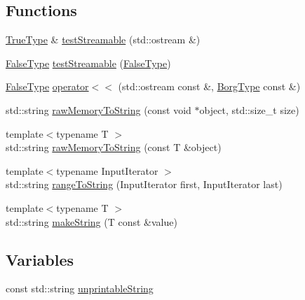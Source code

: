 \subsection*{Functions}
\begin{DoxyCompactItemize}
\item 
\hyperlink{struct_catch_1_1_detail_1_1_true_type}{True\+Type} \& \hyperlink{namespace_catch_1_1_detail_aff0ca0f561ad8053654ab27d54486197}{test\+Streamable} (std\+::ostream \&)
\item 
\hyperlink{struct_catch_1_1_detail_1_1_false_type}{False\+Type} \hyperlink{namespace_catch_1_1_detail_aac81f01b0d687f75b8f24a925591b7ac}{test\+Streamable} (\hyperlink{struct_catch_1_1_detail_1_1_false_type}{False\+Type})
\item 
\hyperlink{struct_catch_1_1_detail_1_1_false_type}{False\+Type} \hyperlink{namespace_catch_1_1_detail_ae9a44d574c4fbd18fabaaee05a433d88}{operator$<$$<$} (std\+::ostream const \&, \hyperlink{struct_catch_1_1_detail_1_1_borg_type}{Borg\+Type} const \&)
\item 
std\+::string \hyperlink{namespace_catch_1_1_detail_ac5d6c510e565ee5bddcc2236194ce29e}{raw\+Memory\+To\+String} (const void $\ast$object, std\+::size\+\_\+t size)
\item 
{\footnotesize template$<$typename T $>$ }\\std\+::string \hyperlink{namespace_catch_1_1_detail_a371620ed524abfcae5c3772bf49b563a}{raw\+Memory\+To\+String} (const T \&object)
\item 
{\footnotesize template$<$typename Input\+Iterator $>$ }\\std\+::string \hyperlink{namespace_catch_1_1_detail_a6650a1dff325bf29962ff15ae73fd972}{range\+To\+String} (Input\+Iterator first, Input\+Iterator last)
\item 
{\footnotesize template$<$typename T $>$ }\\std\+::string \hyperlink{namespace_catch_1_1_detail_aef46b4178e08758524d25d1d969a503c}{make\+String} (T const \&value)
\end{DoxyCompactItemize}
\subsection*{Variables}
\begin{DoxyCompactItemize}
\item 
const std\+::string \hyperlink{namespace_catch_1_1_detail_a466775f4eec29ffef29ab334cd885136}{unprintable\+String}
\end{DoxyCompactItemize}


